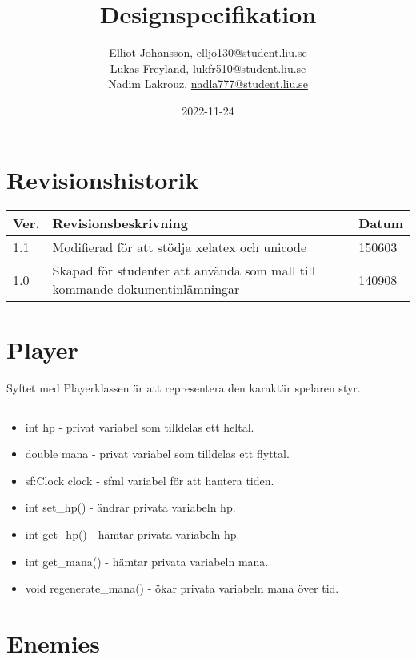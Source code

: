 \documentclass{TDP005mall}
\author{Elliot Johansson, \url{elljo130@student.liu.se}\\
  Lukas Freyland, \url{lukfr510@student.liu.se}\\
  Nadim Lakrouz, \url{nadla777@student.liu.se}}
\title{Designspecifikation}
\date{2022-11-24}
\begin{document}
\projectpage
\section{Revisionshistorik}
\begin{table}[!h]
\begin{tabularx}{\linewidth}{|l|X|l|}
\hline
Ver. & Revisionsbeskrivning & Datum \\\hline
1.1 & Modifierad för att stödja xelatex och unicode & 150603 \\\hline
1.0 & Skapad för studenter att använda som mall till
kommande dokumentinlämningar & 140908 \\\hline
\end{tabularx}
\end{table}

\section{Player}

Syftet med Playerklassen är att representera den karaktär spelaren styr. 

\subsection{}

\begin{itemize}
    \item int hp - privat variabel som tilldelas ett heltal. 
    \item double mana - privat variabel som tilldelas ett flyttal. 
    \item sf:Clock clock - sfml variabel för att hantera tiden.
    \item int set_hp() - ändrar privata variabeln hp.
    \item int get_hp() - hämtar privata variabeln hp.
    \item int get_mana() - hämtar privata variabeln mana.
    \item void regenerate_mana() - ökar privata variabeln mana över tid.
   
\end{itemize}


\section{Enemies}
\end{document}
